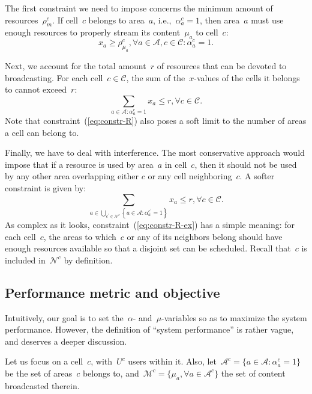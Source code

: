 \documentclass[10pt, conference, compsocconf]{IEEEtran}
\newcommand{\Cc}{\mathcal{C}}
\newcommand{\Ac}{\mathcal{A}}
\newcommand{\Mc}{\mathcal{M}}
\newcommand{\Nc}{\mathcal{N}}
\numberwithin{equation}{section}
\begin{document}
The first constraint we need to impose concerns the minimum amount of resources~$\rho^c_m$. If cell~$c$
belongs to area~$a$, i.e.,~$\alpha^c_a=1$, then area~$a$ must use enough resources to properly stream
its content~$\mu_a$ to cell~$c$:
\begin{equation}
\label{eq:constr-mu}
x_a\geq\rho^c_{\mu_a},\forall a\in\Ac,c\in\Cc\colon\alpha^c_a=1.
\end{equation}

Next, we account for 
the total amount~$r$ of resources that can be devoted to broadcasting. For each cell~$c\in\Cc$, the sum of the~$x$-values of the cells
it belongs to cannot exceed~$r$:
\begin{equation}
\label{eq:constr-R}
\sum_{a\in\Ac\colon\alpha^c_a=1}x_a\leq r,\forall c\in\Cc.
\end{equation}
Note that constraint~(\ref{eq:constr-R}) also poses a soft limit to the number of areas a cell can belong to.

Finally, we have to deal with interference. The most conservative approach would impose that if a resource
is used by area~$a$ in cell~$c$, then it should not be used by any other area overlapping either $c$
or any cell neighboring~$c$. A softer constraint is given by:
\begin{equation}
\label{eq:constr-R-ex}
\sum_{a\in\bigcup_{c^{\prime}\in \Nc^c}\left\{a\in\Ac\colon\alpha^{c^{\prime}}_a=1\right\}}x_a\leq r,\forall c\in\Cc.
\end{equation}
As complex as it looks, constraint~(\ref{eq:constr-R-ex}) has a simple meaning: for each cell~$c$, the areas to
which~$c$ or any of its neighbors belong should have enough resources
available so that a disjoint set can be scheduled. Recall that~$c$ is
included in~$\Nc^c$ by definition.

\subsection{Performance metric and objective}

Intuitively, our goal is to set the~$\alpha$- and~$\mu$-variables so as to maximize the system performance.
However, the definition of ``system performance'' is rather vague, and deserves a deeper discussion.

Let us focus on a cell~$c$, with~$U^c$ users within it. Also, let~$\Ac^c=\{a\in\Ac\colon \alpha^c_a=1\}$ be the
set of areas~$c$ belongs to, and~$\Mc^c=\{\mu_a,\forall a\in \Ac^c\}$ the set of content broadcasted therein.
\end{document}
